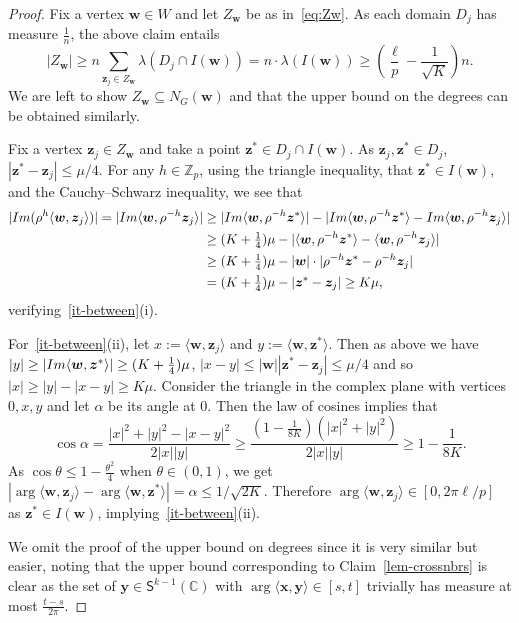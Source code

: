 \documentclass[11pt, a4paper]{article}
\newcommand\innerp[1]{\langle #1 \rangle}
\newcommand{\V}[1]{\mathbold{#1}}
\theoremstyle{definition}
\newcommand{\iminnerp}[1]{{\rm{Im}}\langle #1 \rangle}
\newcommand{\im}[1]{{\rm{Im}}(#1)}
\newcommand{\sS}{\mathsf{S}}
\newcommand{\sZ}{\mathbb{Z}}
\begin{document}
\begin{proof}
	Fix a vertex $\V{w}\in W$ and let $Z_{\V w}$ be as in~\eqref{eq:Zw}. As each domain $D_j$ has measure $\frac{1}{n}$, the above claim entails
	\begin{equation*}
		|Z_\V{w}|\ge n\sum_{\V{z}_{j}\in Z_\V{w}}\lambda(D_j\cap I(\V{w}))=n\cdot\lambda(I(\V{w}))\ge \left(\frac{\ell}{p}-\frac{1}{\sqrt{K}}\right)n.
	\end{equation*}  
    We are left to show $Z_{\V w}\subseteq N_G(\V w)$ and that the upper bound on the degrees can be obtained similarly.
	
	Fix a vertex $\V{z}_j\in Z_\V{w}$ and take a point $\V{z}^*\in D_j\cap I(\V{w})$. As $\V z_j,\V z^*\in D_j$, $|\V{z}^*-\V{z}_j|\le \mu/4$. For any $h\in \sZ_p$, using the triangle inequality, that $\V z^*\in I(\V{w})$, and the Cauchy–Schwarz inequality, we see that
	\begin{align*}
		|\im{\rho^h \innerp{\V{w},\V{z}_j}}|=|\iminnerp{\V{w},\rho^{-h}\V{z}_j}|&\ge |\iminnerp{\V{w},\rho^{-h}\V{z}^*}|-|\iminnerp{\V{w},\rho^{-h}\V{z}^*}-\iminnerp{\V{w},\rho^{-h}\V{z}_j}|\\
		&\ge (K+\tfrac{1}{4})\mu-|\innerp{\V{w},\rho^{-h}\V{z}^*}-\innerp{\V{w},\rho^{-h}\V{z}_j}|\\
		&\ge(K+\tfrac{1}{4})\mu-|\V{w}|\cdot|\rho^{-h}\V{z}^*-\rho^{-h}\V{z}_{j}|\\
		&=(K+\tfrac{1}{4})\mu-|\V{z}^*-\V{z}_{j}|\ge K\mu,
	\end{align*}  
	verifying~\ref{it-between}(i). 
	
	For~\ref{it-between}(ii), let $x:=\innerp{\V{w},\V{z}_j}$ and $y:=\innerp{\V{w},\V{z}^*}$. Then as above we have $|y|\ge |\iminnerp{\V{w},\V{z}^*}|\ge (K+\frac{1}{4})\mu$, $|x-y|\le |\V w||\V z^*-\V z_j|\le \mu/4$ and so $|x|\ge |y|-|x-y|\ge K\mu$.
	Consider the triangle in the complex plane with vertices $0,x,y$ and let $\alpha$ be its angle at $0$. Then the law of cosines implies that
	$$\cos\alpha=\frac{|x|^2+|y|^2-|x-y|^2}{2|x||y|}\ge\frac{(1-\frac{1}{8K})(|x|^2+|y|^2)}{2|x||y|}\ge 1-\frac{1}{8K}.$$
	As $\cos \theta\le 1-\frac{\theta^2}{4}$ when $\theta\in(0,1)$, we get $|\arg\innerp{\V{w},\V{z}_j} - \arg\innerp{\V{w},\V{z}^*}|=\alpha\le 1/\sqrt{2K}$. Therefore $\arg\innerp{\V{w},\V{z}_j}\in [0,2\pi\ell/p]$ as $\V z^*\in I(\V w)$, implying~\ref{it-between}(ii).
	
	We omit the proof of the upper bound on degrees since it is very similar but easier, noting that the upper bound corresponding to Claim~\ref{lem-crossnbrs} is clear as the set of $\V{y} \in \sS^{k-1}(\mathbb{C})$ with $\arg\innerp{\V{x},\V{y}} \in [s,t]$ trivially has measure at most $\frac{t-s}{2\pi}$.
\end{proof}
\end{document}
